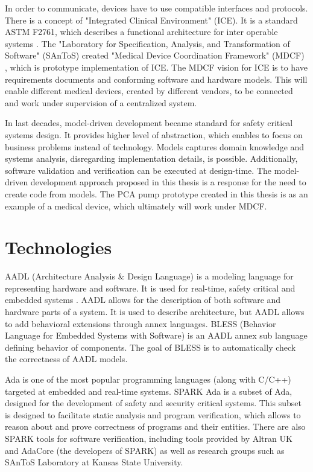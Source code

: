 In order to communicate, devices have to use compatible interfaces and protocols. There is a concept of "Integrated Clinical Environment" (ICE). It is a standard ASTM F2761, which describes a functional architecture for inter operable systems \cite{MedicalApplicationPlatforms:Paper}. The "Laboratory for Specification, Analysis, and Transformation of Software" (SAnToS) created "Medical Device Coordination Framework" (MDCF) \cite{MedicalApplicationPlatforms:Paper}, which is prototype implementation of ICE. The MDCF vision for ICE is to have requirements documents and conforming software and hardware models. This will enable different medical devices, created by different vendors, to be connected and work under supervision of a centralized system.

In last decades, model-driven development \cite{ModelDrivenDevelopmentBook} became standard for safety critical systems design. It provides higher level of abstraction, which enables to focus on business problems instead of technology. Models captures domain knowledge and systems analysis, disregarding implementation details, is possible. Additionally, software validation and verification can be executed at design-time. The model-driven development approach proposed in this thesis is a response for the need to create code from models. The PCA pump prototype created in this thesis is as an example of a medical device, which ultimately will work under MDCF.


\section{Technologies}
\label{introduction:technologies}

AADL (Architecture Analysis \& Design Language) \cite{AadlBook} is a modeling language for representing hardware and software. It is used for real-time, safety critical and embedded systems \cite{AADL:Paper}. AADL allows for the description of both software and hardware parts of a system. It is used to describe architecture, but AADL allows to add behavioral extensions through annex languages. BLESS (Behavior Language for Embedded Systems with Software) \cite{Bless:Paper} is an AADL annex sub language defining behavior of components. The goal of BLESS is to automatically check the correctness of AADL models.

Ada is one of the most popular programming languages (along with C/C++) targeted at embedded and real-time systems. SPARK Ada \cite{Barnes:Book} is a subset of Ada, designed for the development of safety and security critical systems. This subset is designed to facilitate static analysis and program verification, which allows to reason about and prove correctness of programs and their entities. There are also SPARK tools for software verification, including tools provided by Altran UK and AdaCore (the developers of SPARK) as well as research groups such as SAnToS Laboratory at Kansas State University.


